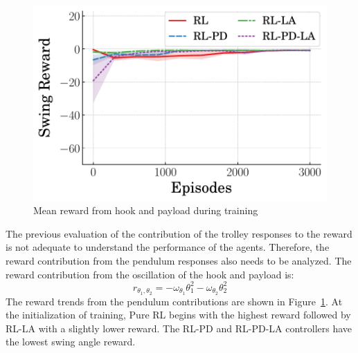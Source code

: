 %
\begin{figure}[tb]
    \centering
    \includegraphics[width=0.65\columnwidth]{figures/figures_RL_model_based_control/Swing_reward_v_episode.pdf}
    \vspace{-2ex}
    \caption{Mean reward from hook and payload during training}
    \label{fig:mean_swing_ISE_baseline}
\end{figure}
%
%
The previous evaluation of the contribution of the trolley responses to the reward is not adequate to understand the performance of the agents. Therefore, the reward contribution from the pendulum responses also needs to be analyzed.
The reward contribution from the oscillation of the hook and payload is:
%
\begin{equation}
    r_{\theta_1,\theta_2}=-\omega_{\theta_1} \theta_1^2 - \omega_{\theta_2} \theta_2^2
\end{equation}
%
The reward trends from the pendulum contributions are shown in Figure~\ref{fig:mean_swing_ISE_baseline}.
%
At the initialization of training, Pure RL begins with the highest reward followed by RL-LA with a slightly lower reward. The RL-PD and RL-PD-LA controllers have the lowest swing angle reward.
%
%
